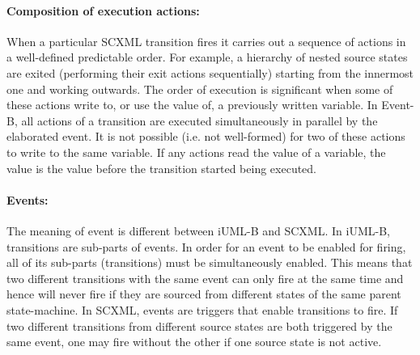 \paragraph{Composition of execution actions:}
When a particular SCXML transition fires it carries out a sequence of actions in a well-defined predictable order. 
For example, a hierarchy of nested source states are exited (performing their exit actions sequentially) starting from the innermost one and working outwards.
The order of execution is significant when some of these actions write to, or use the value of, a previously written variable. 
In Event-B, all actions of a transition are executed simultaneously in parallel by the elaborated event. 
It  is not possible (i.e. not well-formed) for two of these actions to write to the same variable.
If any actions read the value of a variable, the value is the value before the transition started being executed.
\vspace{-0.10cm}


\paragraph{Events:}
The meaning of event is different between iUML-B and SCXML.
 In iUML-B, transitions are sub-parts of events. 
 In order for an event to be enabled for firing, all of its sub-parts (transitions) must be simultaneously enabled. 
 This means that two different transitions with the same event can only fire at the same time and hence will never fire if they are sourced from different states of the same parent state-machine. 
In SCXML, events are triggers that enable transitions to fire. 
If two different transitions from different source states are both triggered by the same event, one may fire without the other if one source state is not active.
\vspace{-0.10cm}

